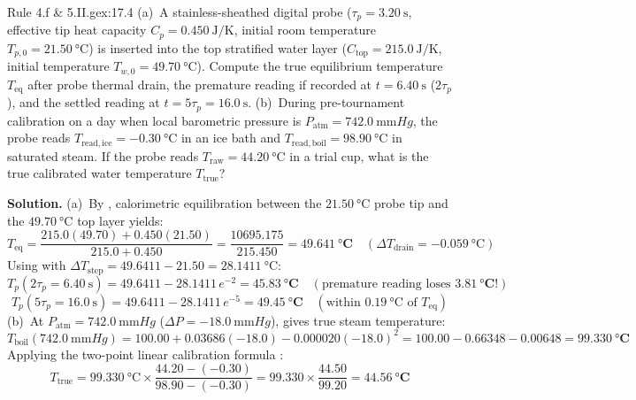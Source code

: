 \begin{workedexample}{Rule 4.f \& 5.II.g}{ex:17.4}
(a)~A stainless-sheathed digital probe ($\tau_p = \SI{3.20}{\second}$, effective tip heat capacity $C_p = \SI{0.450}{\joule\per\kelvin}$, initial room temperature $T_{p,0} = \SI{21.50}{\celsius}$) is inserted into the top stratified water layer ($C_{\mathrm{top}} = \SI{215.0}{\joule\per\kelvin}$, initial temperature $T_{w,0} = \SI{49.70}{\celsius}$). Compute the true equilibrium temperature $T_{\mathrm{eq}}$ after probe thermal drain, the premature reading if recorded at $t = \SI{6.40}{\second}$ ($2\tau_p$), and the settled reading at $t = 5\tau_p = \SI{16.0}{\second}$.
(b)~During pre-tournament calibration on a day when local barometric pressure is $P_{\mathrm{atm}} = \SI{742.0}{\milli\meter Hg}$, the probe reads $T_{\mathrm{read,ice}} = -\SI{0.30}{\celsius}$ in an ice bath and $T_{\mathrm{read,boil}} = \SI{98.90}{\celsius}$ in saturated steam. If the probe reads $T_{\mathrm{raw}} = \SI{44.20}{\celsius}$ in a trial cup, what is the true calibrated water temperature $T_{\mathrm{true}}$?
\par\smallskip\noindent
\textbf{Solution.}
(a)~By , calorimetric equilibration between the $\SI{21.50}{\celsius}$ probe tip and the $\SI{49.70}{\celsius}$ top layer yields:
$$T_{\mathrm{eq}} = \frac{215.0(49.70) + 0.450(21.50)}{215.0 + 0.450} = \frac{10695.175}{215.450} = \mathbf{\SI{49.641}{\celsius}} \quad (\Delta T_{\mathrm{drain}} = -\SI{0.059}{\celsius})$$
Using  with $\Delta T_{\mathrm{step}} = 49.6411 - 21.50 = \SI{28.1411}{\celsius}$:
$$T_p(2\tau_p = \SI{6.40}{\second}) = 49.6411 - 28.1411\,e^{-2} = \mathbf{\SI{45.83}{\celsius}} \quad (\text{premature reading loses }\mathbf{\SI{3.81}{\celsius}}\text{!})$$
$$T_p(5\tau_p = \SI{16.0}{\second}) = 49.6411 - 28.1411\,e^{-5} = \mathbf{\SI{49.45}{\celsius}} \quad (\text{within }\SI{0.19}{\celsius}\text{ of }T_{\mathrm{eq}})$$
(b)~At $P_{\mathrm{atm}} = \SI{742.0}{\milli\meter Hg}$ ($\Delta P = -\SI{18.0}{\milli\meter Hg}$),  gives true steam temperature:
$$T_{\mathrm{boil}}(\SI{742.0}{\milli\meter Hg}) = 100.00 + \num{0.03686}(-18.0) - \num{0.000020}(-18.0)^2 = 100.00 - 0.66348 - 0.00648 = \mathbf{\SI{99.330}{\celsius}}$$
Applying the two-point linear calibration formula :
$$T_{\mathrm{true}} = \SI{99.330}{\celsius} \times \frac{44.20 - (-0.30)}{98.90 - (-0.30)} = 99.330 \times \frac{44.50}{99.20} = \mathbf{\SI{44.56}{\celsius}}$$
\end{workedexample}

